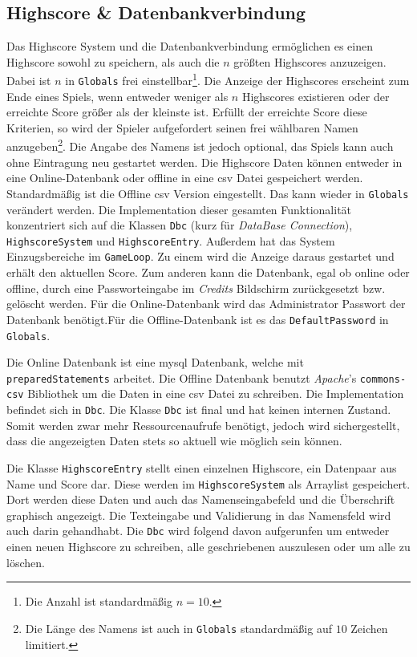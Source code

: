 \subsection{Highscore \& Datenbankverbindung}

Das Highscore System und die Datenbankverbindung ermöglichen es einen Highscore sowohl zu speichern, als auch die $n$ größten Highscores anzuzeigen.
Dabei ist $n$ in \texttt{Globals} frei einstellbar\footnote{Die Anzahl ist standardmäßig $n=10$.}.
Die Anzeige der Highscores erscheint zum Ende eines Spiels, wenn entweder weniger als $n$ Highscores existieren oder der erreichte Score größer als der kleinste ist.
Erfüllt der erreichte Score diese Kriterien, so wird der Spieler aufgefordert seinen frei wählbaren Namen anzugeben\footnote{Die Länge des Namens ist auch in \texttt{Globals} standardmäßig auf $10$ Zeichen limitiert.}.
Die Angabe des Namens ist jedoch optional, das Spiels kann auch ohne Eintragung neu gestartet werden.
Die Highscore Daten können entweder in eine Online-Datenbank oder offline in eine \gls{csv} Datei gespeichert werden.
Standardmäßig ist die Offline \gls{csv} Version eingestellt.
Das kann wieder in \texttt{Globals} verändert werden.
Die Implementation dieser gesamten Funktionalität konzentriert sich auf die Klassen \texttt{Dbc} (kurz für \textit{DataBase Connection}), \texttt{HighscoreSystem} und \texttt{HighscoreEntry}.
Außerdem hat das System Einzugsbereiche im \texttt{GameLoop}.
Zu einem wird die Anzeige daraus gestartet und erhält den aktuellen Score.
Zum anderen kann die Datenbank, egal ob online oder offline, durch eine Passworteingabe im \textit{Credits} Bildschirm zurückgesetzt bzw. gelöscht werden.
Für die Online-Datenbank wird das Administrator Passwort der Datenbank benötigt.Für die Offline-Datenbank ist es das \texttt{DefaultPassword} in \texttt{Globals}.

Die Online Datenbank ist eine \gls{mysql} Datenbank, welche mit \texttt{preparedStatements} arbeitet.
Die Offline Datenbank benutzt \textit{Apache}'s \texttt{commons-csv} Bibliothek um die Daten in eine \gls{csv} Datei zu schreiben.
Die Implementation befindet sich in \texttt{Dbc}.
Die Klasse \texttt{Dbc} ist final und hat keinen internen Zustand.
Somit werden zwar mehr Ressourcenaufrufe benötigt, jedoch wird sichergestellt, dass die angezeigten Daten stets so aktuell wie möglich sein können.

Die Klasse \texttt{HighscoreEntry} stellt einen einzelnen Highscore, ein Datenpaar aus Name und Score dar.
Diese werden im \texttt{HighscoreSystem} als Arraylist gespeichert.
Dort werden diese Daten und auch das Namenseingabefeld und die Überschrift graphisch angezeigt.
Die Texteingabe und Validierung in das Namensfeld wird auch darin gehandhabt.
Die \texttt{Dbc} wird folgend davon aufgerunfen um entweder einen neuen Highscore zu schreiben, alle geschriebenen auszulesen oder um alle zu löschen.
